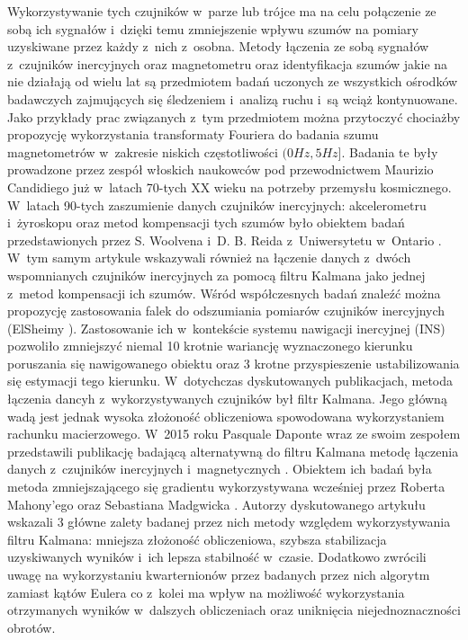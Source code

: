 Wykorzystywanie tych czujników w~parze lub trójce ma na celu połączenie ze sobą ich sygnałów i~dzięki temu zmniejszenie wpływu szumów na pomiary uzyskiwane przez każdy z~nich z~osobna. Metody łączenia ze sobą sygnałów z~czujników inercyjnych oraz magnetometru oraz identyfikacja szumów jakie na nie działają od wielu lat są przedmiotem badań uczonych ze wszystkich ośrodków badawczych zajmujących się śledzeniem i~analizą ruchu i~są wciąż kontynuowane. Jako przykłady prac związanych z~tym przedmiotem można przytoczyć chociażby propozycję wykorzystania transformaty Fouriera do badania szumu magnetometrów w~zakresie niskich częstotliwości $(0Hz, 5Hz]$. Badania te były prowadzone przez zespół włoskich naukowców pod przewodnictwem Maurizio Candidiego już w~latach 70-tych XX wieku \cite{Candidi1974} na potrzeby przemysłu kosmicznego. W~latach 90-tych zaszumienie danych czujników inercyjnych: akcelerometru i~żyroskopu oraz metod kompensacji tych szumów było obiektem badań przedstawionych przez S. Woolvena i~D. B. Reida z~Uniwersytetu w~Ontario \cite{Woolven1994}. W~tym samym artykule wskazywali również na łączenie danych z~dwóch wspomnianych czujników inercyjnych za pomocą filtru Kalmana jako jednej z~metod kompensacji ich szumów. Wśród współczesnych badań znaleźć można propozycję zastosowania falek do odszumiania pomiarów czujników inercyjnych (ElSheimy  \cite{ElSheimy2004}). Zastosowanie ich w~kontekście systemu nawigacji inercyjnej (INS) pozwoliło zmniejszyć niemal 10 krotnie wariancję wyznaczonego kierunku poruszania się nawigowanego obiektu oraz 3 krotne przyspieszenie ustabilizowania się estymacji tego kierunku. W~dotychczas dyskutowanych publikacjach, metoda łączenia dancyh z~wykorzystywanych czujników był filtr Kalmana. Jego główną wadą jest jednak wysoka złożoność obliczeniowa spowodowana wykorzystaniem rachunku macierzowego. W~2015 roku Pasquale Daponte wraz ze swoim zespołem przedstawili publikację badającą alternatywną do filtru Kalmana metodę łączenia danych z~czujników inercyjnych i~magnetycznych \cite{Daponte2015}. Obiektem ich badań była metoda zmniejszającego się gradientu wykorzystywana wcześniej przez Roberta Mahony'ego \cite{Mahony2005a} oraz Sebastiana Madgwicka \cite{Madgwick2011}. Autorzy dyskutowanego artykułu wskazali 3 główne zalety badanej przez nich metody względem wykorzystywania filtru Kalmana: mniejsza złożoność obliczeniowa, szybsza stabilizacja uzyskiwanych wyników i~ich lepsza stabilność w~czasie. Dodatkowo zwrócili uwagę na wykorzystaniu kwarternionów przez badanych przez nich algorytm zamiast kątów Eulera co z~kolei ma wpływ na możliwość wykorzystania otrzymanych wyników w~dalszych obliczeniach oraz uniknięcia niejednoznaczności obrotów. \\
